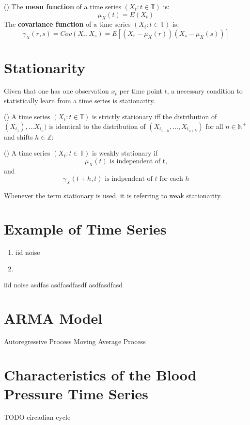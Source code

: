 \begin{definition}(\citeauthor{brockwell_introduction_2016})
    The \textbf{mean function} of a time series $(X_t: t \in \mathbb{T})$ is:
    \[
        \mu_X(t) = E(X_t)
    \]
    The \textbf{covariance function} of a time series $(X_t: t \in \mathbb{T})$ is:
    \[
        \gamma_X(r,s) = Cov(X_r, X_s) = E[(X_r - \mu_X(r))(X_s-\mu_X(s))]
    \]
\end{definition}

\section{Stationarity}

Given that one has one observation $x_t$ per time point $t$,
a necessary condition to statistically learn from a time series is stationarity.

\begin{definition}(\citeauthor{brockwell_introduction_2016})
    A time series $(X_t: t \in \mathbb{T})$ is strictly stationary iff
    the distribution of $(X_{t_1}), \dots X_{t_n})$ is identical to the distribution of
    $(X_{t_{1+h}}, \dots ,X_{t_{n+h}})$ for all $n \in \mathbb{N}^{+}$
    and shifts $h \in \mathbb{Z}$:
\end{definition}


\begin{definition}(\citeauthor{brockwell_introduction_2016})
    A time series $(X_t: t \in \mathbb{T})$ is weakly stationary if
    \[
        \mu_X(t) \text{ is independent of t,}
    \]
    and
    \[
        \gamma_X(t+h, t) \text{ is indpendent of $t$ for each $h$}
    \]
\end{definition}

Whenever the term stationary is used, it is referring to weak stationarity.

\section{Example of Time Series}

\begin{enumerate}[label=Example \arabic*]
    \item iid noise
    \item
\end{enumerate}

\begin{example}
    iid noise
    asdfas
    asdfasdfasdf
    asdfasdfasd
\end{example}







\section{ARMA Model}






Autoregressive Process
Moving Average Process



\section{Characteristics of the Blood Pressure Time Series}
TODO
circadian cycle

